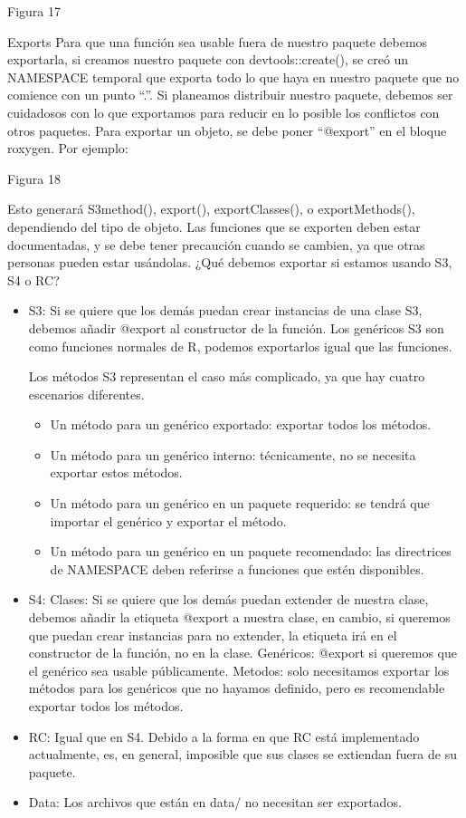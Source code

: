Figura 17

Exports
Para que una funci\'on sea usable fuera de nuestro paquete debemos exportarla, si creamos
nuestro paquete con devtools::create(), se cre\'o un NAMESPACE temporal que exporta todo
lo que haya en nuestro paquete que no comience con un punto “.”. Si planeamos distribuir
nuestro paquete, debemos ser cuidadosos con lo que exportamos para reducir en lo posible
los conflictos con otros paquetes.
Para exportar un objeto, se debe poner “@export” en el bloque roxygen. Por ejemplo:

Figura 18

Esto generar\'a S3method(), export(), exportClasses(), o exportMethods(), dependiendo del
tipo de objeto.
Las funciones que se exporten deben estar documentadas, y se debe tener precauci\'on
cuando se cambien, ya que otras personas pueden estar us\'andolas.
¿Qu\'e debemos exportar si estamos usando S3, S4 o RC?
\renewcommand{\labelitemii}{\textendash}
\begin{itemize}

    \item S3:
Si se quiere que los dem\'as puedan crear instancias de una clase S3, debemos a\~nadir
@export al constructor de la funci\'on. Los gen\'ericos S3 son como funciones normales
de R, podemos exportarlos igual que las funciones.

Los m\'etodos S3 representan el caso m\'as complicado, ya que hay cuatro escenarios
diferentes.

\begin{itemize}
    \item   Un m\'etodo para un gen\'erico exportado: exportar todos los m\'etodos.
    \item   Un m\'etodo para un gen\'erico interno: t\'ecnicamente, no se necesita exportar estos
m\'etodos.
    \item   Un m\'etodo para un gen\'erico en un paquete requerido: se tendr\'a que importar el
gen\'erico y exportar el m\'etodo.
    \item   Un m\'etodo para un gen\'erico en un paquete recomendado: las directrices de
NAMESPACE deben referirse a funciones que est\'en disponibles.
\end{itemize}

    \item S4:
Clases: Si se quiere que los dem\'as puedan extender de nuestra clase, debemos
a\~nadir la etiqueta @export a nuestra clase, en cambio, si queremos que puedan crear
instancias para no extender, la etiqueta ir\'a en el constructor de la funci\'on, no en la
clase.
Gen\'ericos: @export si queremos que el gen\'erico sea usable p\'ublicamente.
Metodos: solo necesitamos exportar los m\'etodos para los gen\'ericos que no hayamos
definido, pero es recomendable exportar todos los m\'etodos.
    \item RC:
Igual que en S4. Debido a la forma en que RC est\'a implementado actualmente, es, en
general, imposible que sus clases se extiendan fuera de su paquete.
    \item Data:
Los archivos que est\'an en data/ no necesitan ser exportados.
\end{itemize}

